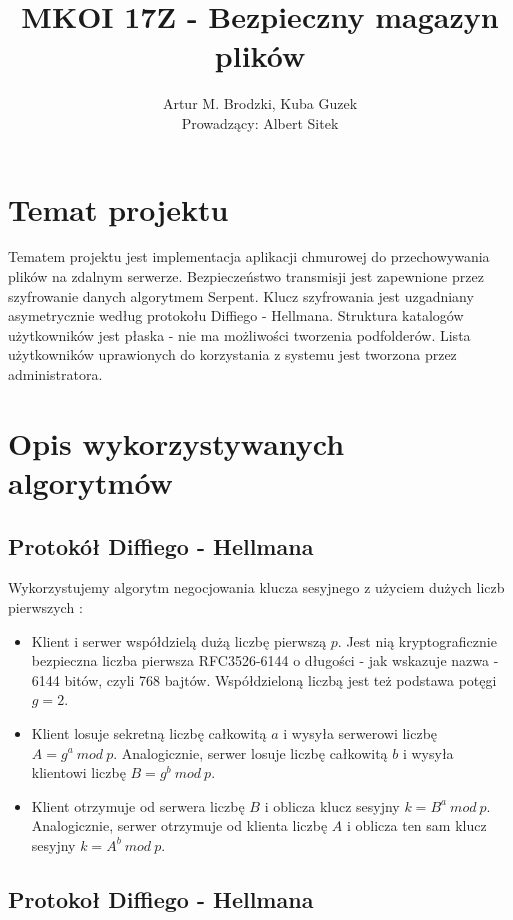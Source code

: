 \documentclass{article}
\author{Artur M. Brodzki, Kuba Guzek \\ Prowadzący: Albert Sitek}
\title{MKOI 17Z - Bezpieczny magazyn plików}
\begin{document}
	\maketitle {}
	
	\newpage {}
	
	\section{Temat projektu}
	Tematem projektu jest implementacja aplikacji chmurowej do przechowywania plików na zdalnym serwerze. Bezpieczeństwo transmisji jest zapewnione przez szyfrowanie danych algorytmem Serpent. Klucz szyfrowania jest uzgadniany asymetrycznie według protokołu Diffiego - Hellmana. Struktura katalogów użytkowników jest płaska - nie ma możliwości tworzenia podfolderów. Lista użytkowników uprawionych do korzystania z systemu jest tworzona przez administratora. 
	
	\section{Opis wykorzystywanych algorytmów}
	\subsection{Protokół Diffiego - Hellmana}
	Wykorzystujemy algorytm negocjowania klucza sesyjnego z użyciem dużych liczb pierwszych \cite{Schneier}: 
	\begin{itemize}
		\item Klient i serwer współdzielą dużą liczbę pierwszą $p$. Jest nią kryptograficznie bezpieczna liczba pierwsza RFC3526-6144 o długości - jak wskazuje nazwa - 6144 bitów, czyli 768 bajtów. Współdzieloną liczbą jest też podstawa potęgi $g=2$. 
		\item Klient losuje sekretną liczbę całkowitą $a$ i wysyła serwerowi liczbę $A=g^a\ mod\ p$. Analogicznie, serwer losuje liczbę całkowitą $b$ i wysyła klientowi liczbę $B=g^b\ mod\ p$. 
		\item Klient otrzymuje od serwera liczbę $B$ i oblicza klucz sesyjny $k=B^a\ mod\ p$. Analogicznie, serwer otrzymuje od klienta liczbę $A$ i oblicza ten sam klucz sesyjny $k=A^b\ mod\ p$. 
	\end{itemize}
	
	\subsection{Protokoł Diffiego - Hellmana}
	
\end{document}
